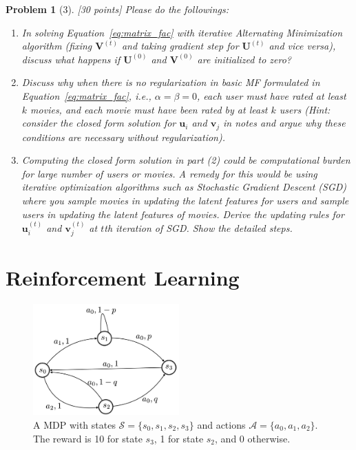 \documentclass[12pt]{article}
\theoremstyle{quest}
\newtheorem*{problem}{Problem}
\begin{document}
\begin{problem}[3] [30 points]
Please do the followings:
\begin{enumerate}
    \item In solving Equation~\ref{eq:matrix_fac} with iterative Alternating Minimization algorithm (fixing $\bm{V}^{(t)}$ and taking gradient step for $\bm{U}^{(t)}$ and vice versa), discuss what happens if $\bm{U}^{(0)}$ and $\bm{V}^{(0)}$ are initialized to zero?
    \item Discuss why when there is no regularization in basic MF formulated in Equation~\ref{eq:matrix_fac}, i.e., $\alpha = \beta = 0$, each user must have rated at least $k$ movies, and each movie must have been rated by at least $k$ users (Hint: consider the closed form solution for $\bm{u}_i$ and $\bm{v}_j$ in notes and argue why these conditions are necessary without regularization).
    \item Computing the closed form solution in part (2) could be computational burden for large number of users or movies. A remedy for this would be using iterative optimization algorithms such as Stochastic Gradient Descent (SGD) where you sample movies in updating the latent features for users and sample users in updating the latent features of movies. Derive the updating rules for $\bm{u}_i^{(t)}$ and $\bm{v}_j^{(t)}$ at $t$th iteration of SGD. Show the detailed steps.
\end{enumerate}
\end{problem}

\section*{Reinforcement Learning}
\begin{figure}[ht!]
\centering
   \includegraphics[width=0.5\textwidth]{mdp.png}
   \caption{A MDP with states $\mathcal{S}=\{s_0,s_1,s_2,s_3\}$ and actions $\mathcal{A}=\{a_0,a_1,a_2\}$. The reward is 10 for state $s_3$, 1 for state $s_2$, and 0 otherwise.}
   \label{fig:mdp}
\end{figure}
\end{document}
